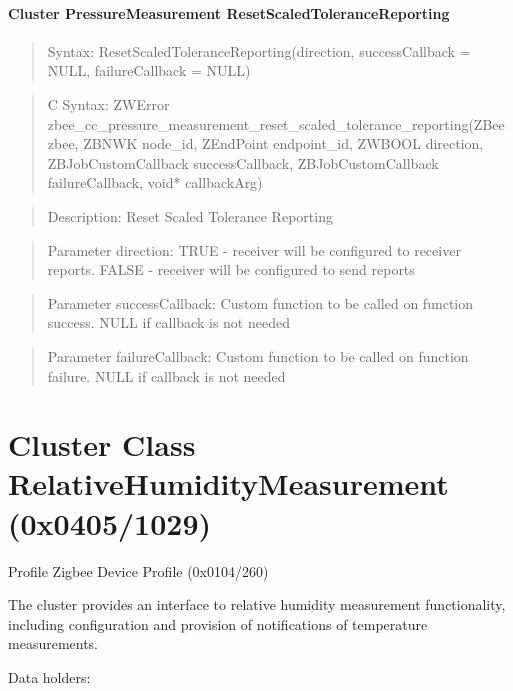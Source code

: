 \paragraph{Cluster PressureMeasurement ResetScaledToleranceReporting}
\begin{quote}Syntax: ResetScaledToleranceReporting(direction, successCallback = NULL, failureCallback = NULL)\end{quote}
\begin{quote}C Syntax: ZWError zbee\_cc\_pressure\_measurement\_reset\_scaled\_tolerance\_reporting(ZBee zbee, ZBNWK node\_id, ZEndPoint endpoint\_id, ZWBOOL direction, ZBJobCustomCallback successCallback, ZBJobCustomCallback failureCallback, void* callbackArg)\end{quote}
\begin{quote}Description: Reset Scaled Tolerance Reporting\end{quote}
\begin{quote}Parameter direction: TRUE  - receiver will be configured to receiver reports. FALSE - receiver will be configured to send reports\end{quote}
\begin{quote}Parameter successCallback: Custom function to be called on function success. NULL if callback is not needed\end{quote}
\begin{quote}Parameter failureCallback: Custom function to be called on function failure. NULL if callback is not needed\end{quote}



\section{Cluster Class RelativeHumidityMeasurement (0x0405/1029)}

Profile Zigbee Device Profile (0x0104/260)

The cluster provides an interface to relative humidity measurement functionality, including configuration and provision of notifications of temperature measurements.
\newline

\noindent
Data holders:

